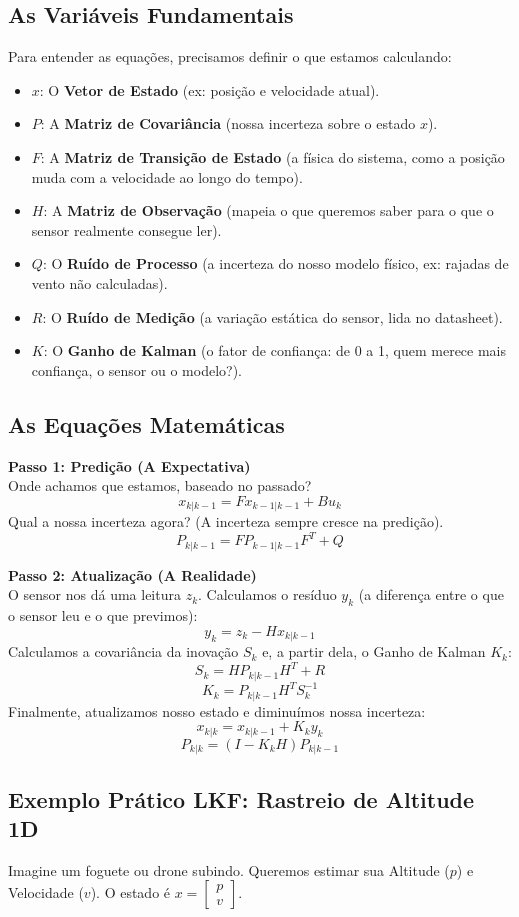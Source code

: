 \documentclass[12pt,a4paper]{article}
\begin{document}
\subsection{As Variáveis Fundamentais}
Para entender as equações, precisamos definir o que estamos calculando:
\begin{itemize}
    \item $x$: O \textbf{Vetor de Estado} (ex: posição e velocidade atual).
    \item $P$: A \textbf{Matriz de Covariância} (nossa incerteza sobre o estado $x$).
    \item $F$: A \textbf{Matriz de Transição de Estado} (a física do sistema, como a posição muda com a velocidade ao longo do tempo).
    \item $H$: A \textbf{Matriz de Observação} (mapeia o que queremos saber para o que o sensor realmente consegue ler).
    \item $Q$: O \textbf{Ruído de Processo} (a incerteza do nosso modelo físico, ex: rajadas de vento não calculadas).
    \item $R$: O \textbf{Ruído de Medição} (a variação estática do sensor, lida no datasheet).
    \item $K$: O \textbf{Ganho de Kalman} (o fator de confiança: de 0 a 1, quem merece mais confiança, o sensor ou o modelo?).
\end{itemize}

\subsection{As Equações Matemáticas}

\textbf{Passo 1: Predição (A Expectativa)} \\
Onde achamos que estamos, baseado no passado?
$$x_{k|k-1} = F x_{k-1|k-1} + B u_k$$
Qual a nossa incerteza agora? (A incerteza sempre cresce na predição).
$$P_{k|k-1} = F P_{k-1|k-1} F^T + Q$$

\textbf{Passo 2: Atualização (A Realidade)} \\
O sensor nos dá uma leitura $z_k$. Calculamos o resíduo $y_k$ (a diferença entre o que o sensor leu e o que previmos):
$$y_k = z_k - H x_{k|k-1}$$
Calculamos a covariância da inovação $S_k$ e, a partir dela, o Ganho de Kalman $K_k$:
$$S_k = H P_{k|k-1} H^T + R$$
$$K_k = P_{k|k-1} H^T S_k^{-1}$$
Finalmente, atualizamos nosso estado e diminuímos nossa incerteza:
$$x_{k|k} = x_{k|k-1} + K_k y_k$$
$$P_{k|k} = (I - K_k H) P_{k|k-1}$$

\subsection{Exemplo Prático LKF: Rastreio de Altitude 1D}
Imagine um foguete ou drone subindo. Queremos estimar sua Altitude ($p$) e Velocidade ($v$). O estado é $x = \begin{bmatrix} p \\ v \end{bmatrix}$.
\end{document}
